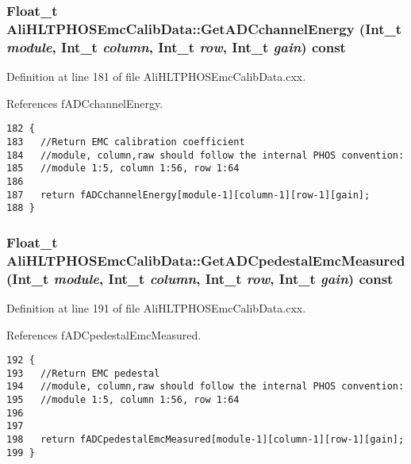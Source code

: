 \subsubsection{\setlength{\rightskip}{0pt plus 5cm}Float\_\-t Ali\-HLTPHOSEmc\-Calib\-Data::Get\-ADCchannel\-Energy (Int\_\-t {\em module}, Int\_\-t {\em column}, Int\_\-t {\em row}, Int\_\-t {\em gain}) const}\label{classAliHLTPHOSEmcCalibData_AliHLTPHOSEmcCalibDataa7}




Definition at line 181 of file Ali\-HLTPHOSEmc\-Calib\-Data.cxx.

References f\-ADCchannel\-Energy.

\footnotesize\begin{verbatim}182 {
183   //Return EMC calibration coefficient
184   //module, column,raw should follow the internal PHOS convention:
185   //module 1:5, column 1:56, row 1:64
186 
187   return fADCchannelEnergy[module-1][column-1][row-1][gain];
188 }
\end{verbatim}\normalsize 


\subsubsection{\setlength{\rightskip}{0pt plus 5cm}Float\_\-t Ali\-HLTPHOSEmc\-Calib\-Data::Get\-ADCpedestal\-Emc\-Measured (Int\_\-t {\em module}, Int\_\-t {\em column}, Int\_\-t {\em row}, Int\_\-t {\em gain}) const}\label{classAliHLTPHOSEmcCalibData_AliHLTPHOSEmcCalibDataa8}




Definition at line 191 of file Ali\-HLTPHOSEmc\-Calib\-Data.cxx.

References f\-ADCpedestal\-Emc\-Measured.

\footnotesize\begin{verbatim}192 {
193   //Return EMC pedestal
194   //module, column,raw should follow the internal PHOS convention:
195   //module 1:5, column 1:56, row 1:64
196 
197 
198   return fADCpedestalEmcMeasured[module-1][column-1][row-1][gain];
199 }
\end{verbatim}\normalsize 


